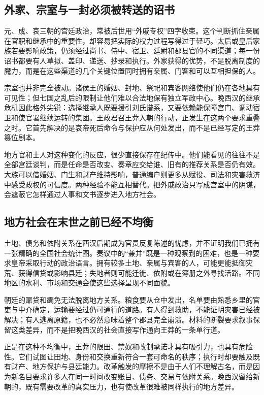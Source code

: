 \subsection{外家、宗室与一封必须被转送的诏书}

元、成、哀三朝的宫廷政治，常被后世用“外戚专权”四字收束。这个判断抓住亲属在官职和继承中的重要性，却容易把实际的权力过程写得过于轻巧。太后或皇后家族若要影响政策，仍须经过尚书、侍中、宿卫、廷尉和郡县官的不同渠道；每一份诏书都要有人草拟、盖印、递送、抄录和执行。外家获得的优势，不是脱离制度的魔力，而是在这些渠道的几个关键位置同时拥有亲属、门客和可以互相担保的人。

宗室也并非完全被动。诸侯王的婚姻、封地、祭祀和宾客网络使他们仍在各地具有可见性；但七国之乱后的限制让他们难以合法地保有独立军政中心。晚西汉的继承危机因此格外尖锐：选择继承人既要援引刘氏谱系，又要依赖能保障宫门、调动宿卫和使官署继续运转的集团。王政君召王莽入朝的行动，正发生在这两个要求重叠之时。它首先解决的是哀帝死后命令与保护应从何处发出，而不是已经写定的王莽篡位剧本。

地方官和士人对这种变化的反应，很少直接保存在纪传中。他们能看见的往往不是全部宫廷谈判，而是任命是否改变、奏章应交给谁、旧有的推荐关系是否仍有效。大族可以借婚姻、门生和财产维持影响，普通编户则更多从赋役、司法和灾害救济中感受政权的可信度。两种经验不能互相替代。把外戚政治只写成宫室中的阴谋，会遮蔽它怎样通过人事和文书逐步进入地方社会。

\subsection{地方社会在末世之前已经不均衡}

土地、债务和依附关系在西汉后期成为官员反复陈述的忧虑，并不证明我们已拥有一张精确的全国社会统计图。奏议中的“兼并”既是一种观察到的困难，也是一种要求皇帝采取行动的政治语言。拥有较多土地、亲属与宾客的人，可能更能抵御灾荒、获得信贷或影响县廷；失地者则可能迁徙、依附或在簿册之外寻找活路。不同地区的水利、市场和交通会使这些选择呈现不同面貌。

朝廷的赈贷和蠲免无法脱离地方关系。粮食要从仓中发出，名单要由熟悉乡里的官吏与中介确定，运输要经过仍可通行的道路。有人得到救助，不能证明灾害已经被解决；有人逃离原籍，也不必然意味着整个郡县完全崩溃。材料的断裂要求叙事保留这类差异，而不是把晚西汉的社会直接写作通向王莽的一条单行道。

正是在这种不均衡中，王莽的限田、禁奴和改制承诺才具有吸引力，也具有危险性。它们试图让田地、身份和交换重新符合一套可命名的秩序；执行时却要触及既有财产、地方保护与县廷能力。改革触发的摩擦不是由于人们不理解古名，而是因为新名目要求许多人在同一时间改变账目、债务、交易与依附关系。晚西汉留给新朝的，既有需要改革的真实压力，也有使改革很难被同样执行的地方差异。

